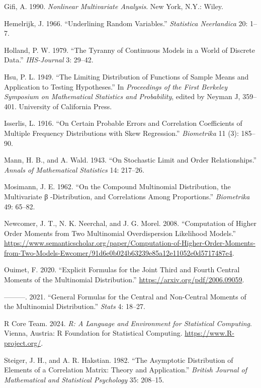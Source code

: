 \documentclass[
  12pt,
  letterpaper,
  DIV=11,
  numbers=noendperiod]{scrartcl}
\newlength{\cslhangindent}
\newenvironment{CSLReferences}[2] %
 {\begin{list}{}{%
  \setlength{\itemindent}{0pt}
  \setlength{\leftmargin}{0pt}
  \setlength{\parsep}{0pt}
  \ifodd #1
   \setlength{\leftmargin}{\cslhangindent}
   \setlength{\itemindent}{-1\cslhangindent}
  \fi
  \setlength{\itemsep}{#2\baselineskip}}}
 {\end{list}}
\begin{document}
\label{refs}
\begin{CSLReferences}{1}{0}
Gifi, A. 1990. \emph{Nonlinear Multivariate Analysis}. New York, N.Y.:
Wiley.

Hemelrijk, J. 1966. {``{Underlining Random Variables}.''}
\emph{Statistica Neerlandica} 20: 1--7.

Holland, P. W. 1979. {``{The Tyranny of Continuous Models in a World of
Discrete Data}.''} \emph{IHS-Journal} 3: 29--42.

Hsu, P. L. 1949. {``The Limiting Distribution of Functions of Sample
Means and Application to Testing Hypotheses.''} In \emph{Proceedings of
the First Berkeley Symposium on Mathematical Statistics and
Probability}, edited by Neyman J, 359--401. University of California
Press.

Isserlis, L. 1916. {``On Certain Probable Errors and Correlation
Coefficients of Multiple Frequency Distributions with Skew
Regression.''} \emph{Biometrika} 11 (3): 185--90.

Mann, H. B., and A. Wald. 1943. {``{On Stochastic Limit and Order
Relationships}.''} \emph{Annals of Mathematical Statistics} 14: 217--26.

Mosimann, J. E. 1962. {``On the Compound Multinomial Distribution, the
Multivariate β -Distribution, and Correlations Among Proportions.''}
\emph{Biometrika} 49: 65--82.

Newcomer, J. T., N. K. Neerchal, and J. G. Morel. 2008. {``Computation
of Higher Order Moments from Two Multinomial Overdispersion Likelihood
Models.''}
\url{https://www.semanticscholar.org/paper/Computation-of-Higher-Order-Moments-from-Two-Models-Ewcomer/91d6e0b024b63239e85a12e11052e0d5717487e4}.

Ouimet, F. 2020. {``Explicit Formulas for the Joint Third and Fourth
Central Moments of the Multinomial Distribution.''}
\url{https://arxiv.org/pdf/2006.09059}.

---------. 2021. {``General Formulas for the Central and Non-Central
Moments of the Multinomial Distribution.''} \emph{Stats} 4: 18--27.

R Core Team. 2024. \emph{R: A Language and Environment for Statistical
Computing}. {Vienna, Austria}: R Foundation for Statistical Computing.
\url{https://www.R-project.org/}.

Steiger, J. H., and A. R. Hakstian. 1982. {``{The Asymptotic
Distribution of Elements of a Correlation Matrix: Theory and
Application}.''} \emph{British Journal of Mathematical and Statistical
Psychology} 35: 208--15.

\end{CSLReferences}
\end{document}
